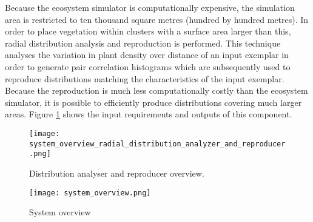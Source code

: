 Because the ecosystem simulator is computationally expensive, the simulation area is restricted to ten thousand square metres (hundred by hundred metres). In order to place vegetation within clusters with a surface area larger than this, radial distribution analysis and reproduction is performed. This technique analyses the variation in plant density over distance of an input exemplar in order to generate pair correlation histograms which are subsequently used to reproduce distributions matching the characteristics of the input exemplar. Because the reproduction is much less computationally costly than the ecosystem simulator, it is possible to efficiently produce distributions covering much larger areas. Figure \ref{fig:system_overview_distribution_analyser_and_reproducer} shows the input requirements and outputs of this component.

\begin{figure}
\center
	\texttt{[image: system\_overview\_radial\_distribution\_analyzer\_and\_reproducer.png]}
	\caption{ Distribution analyser and reproducer overview.}	
	\label{fig:system_overview_distribution_analyser_and_reproducer}
\end{figure}

\begin{figure}
\center
	\texttt{[image: system\_overview.png]}
	\caption{ System overview}	
	\label{fig:system_overview}
\end{figure}
